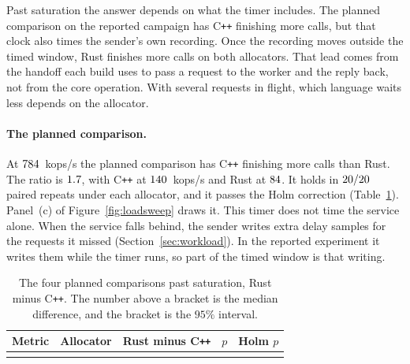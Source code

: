 \documentclass[english,oneside,a4paper,censored,csm,software-track-2020]{HYthesisML}
\begin{document}
Past saturation the answer depends on what the timer includes. The planned
comparison on the reported campaign has C\texttt{++} finishing more calls, but
that clock also times the sender's own recording. Once the recording moves
outside the timed window, Rust finishes more calls on both allocators. That lead
comes from the handoff each build uses to pass a request to the worker and the
reply back, not from the core operation. With several requests in flight, which
language waits less depends on the allocator.

\paragraph{The planned comparison.}
At $784$~kops/s the planned comparison has C\texttt{++} finishing
more calls than Rust. The ratio is $1.7$, with C\texttt{++} at
$140$~kops/s and Rust at $84$. It holds in
$20/20$ paired repeats under each allocator, and it passes the
Holm correction (Table~\ref{tab:overloadtest}). Panel~(c) of
Figure~\ref{fig:loadsweep} draws it. This timer does not time the service
alone. When the service falls behind, the sender writes extra delay samples
for the requests it missed (Section~\ref{sec:workload}). In the reported
experiment it writes them while the timer runs, so part of the timed window
is that writing.

\begin{table}[!ht]
\centering
\small
\caption[The four planned comparisons past saturation]{The four planned comparisons past saturation, Rust minus C\texttt{++}. The number above a bracket is the median difference, and the bracket is the $95\%$ interval.\label{tab:overloadtest}}
\setlength{\tabcolsep}{4pt}
\begin{tabular}{@{}l l r r r@{}}
\hline\hline
Metric & Allocator & Rust minus C\texttt{++} & $p$ & Holm $p$ \\
\hline
\\
\hline
\end{tabular}
\end{table}
\end{document}
